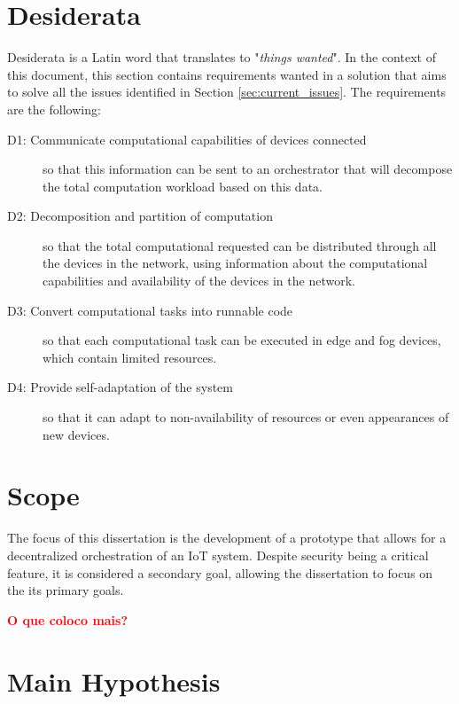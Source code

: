 \section{Desiderata}\label{sec:desiderata}

Desiderata is a Latin word that translates to "\emph{things wanted}". In the context of this document, this section contains requirements wanted in a solution that aims to solve all the issues identified in Section \ref{sec:current_issues}. The requirements are the following:

\begin{description}
    \item [D1: Communicate computational capabilities of devices connected] so that this information can be sent to an orchestrator that will decompose the total computation workload based on this data.
    \item [D2: Decomposition and partition of computation] so that the total computational requested can be distributed through all the devices in the network, using information about the computational capabilities and availability of the devices in the network.
    \item [D3: Convert computational tasks into runnable code] so that each computational task can be executed in edge and fog devices, which contain limited resources.
    \item [D4: Provide self-adaptation of the system] so that it can adapt to non-availability of resources or even appearances of new devices.
\end{description}

\section{Scope}\label{sec:scope}

The focus of this dissertation is the development of a prototype that allows for a decentralized orchestration of an IoT system. Despite security being a critical feature, it is considered a secondary goal, allowing the dissertation to focus on the its primary goals.

\textcolor{red}{\textbf{O que coloco mais?}}


\section{Main Hypothesis}\label{sec:stat_research_questions}

